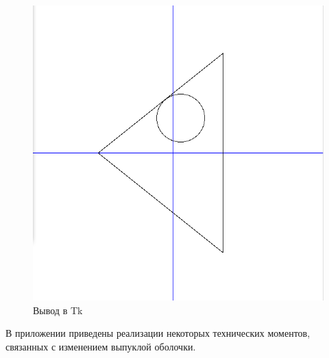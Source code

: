 \begin{figure}[ht!]
\begin{center}
\includegraphics[width=0.5\hsize]{images/poly1}
\end{center}
\caption{Вывод в Tk}\label{fig:poly1}
\end{figure}


 В приложении приведены  реализации некоторых технических моментов, связанных с изменением выпуклой оболочки.


